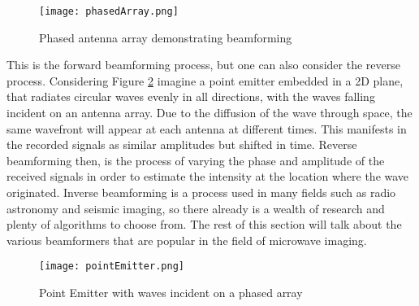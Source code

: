 \begin{figure}[!h]
    \texttt{[image: phasedArray.png]}
    \centering
    \caption{Phased antenna array demonstrating beamforming}
    \label{fig:phasedArray}
\end{figure}
\FloatBarrier This is the forward beamforming process, but one can also consider the reverse process. Considering Figure
\ref{fig:pointEmitter} imagine a point emitter embedded in a 2D plane, that radiates circular waves evenly in all
directions, with the waves falling incident on an antenna array. Due to the diffusion of the wave through space, the
same wavefront will appear at each antenna at different times. This manifests in the recorded signals as similar
amplitudes but shifted in time. Reverse beamforming then, is the process of varying the phase and amplitude of the
received signals in order to estimate the intensity at the location where the wave originated. Inverse beamforming is a
process used in many fields such as radio astronomy and seismic imaging, so there already is a wealth of research and
plenty of algorithms to choose from. The rest of this section will talk about the various beamformers that are popular
in the field of microwave imaging. \hfill \break

\begin{figure}[!h]
    \texttt{[image: pointEmitter.png]}
    \centering
    \caption{Point Emitter with waves incident on a phased array}
    \label{fig:pointEmitter}
\end{figure}
\FloatBarrier
